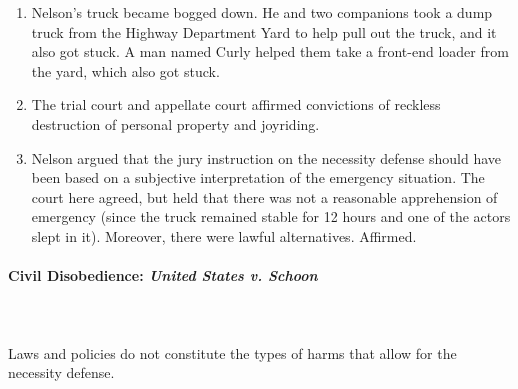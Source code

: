 \begin{enumerate}
    \item Nelson's truck became bogged down. He and two companions took a dump 
    truck from the Highway Department Yard to help pull out the truck, and it 
    also got stuck. A man named Curly helped them take a front-end loader from 
    the yard, which also got stuck.
    \item The trial court and appellate court affirmed convictions of reckless 
    destruction of personal property and joyriding.
    \item Nelson argued that the jury instruction on the necessity defense 
    should have been based on a subjective interpretation of the emergency 
    situation. The court here agreed, but held that there was not a reasonable 
    apprehension of emergency (since the truck remained stable for 12 hours 
    and one of the actors slept in it). Moreover, there were lawful 
    alternatives. Affirmed.
\end{enumerate}

\paragraph{Civil Disobedience: \emph{United States v. Schoon}}
~\\\\
Laws and policies do not constitute the types of harms that allow for the 
necessity defense.

